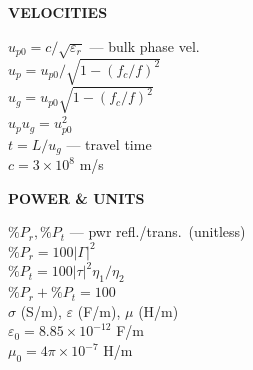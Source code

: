 \documentclass[6pt,letterpaper]{article}
\newcommand{\shead}[3]{%
  \noindent\colorbox{#1}{\parbox{\dimexpr\linewidth-2\fboxsep\relax}%
  {\color{#2}\bfseries\fontsize{6}{7}\selectfont #3}}\vspace{0.5pt}}
\begin{document}
\begin{minipage}[t]{0.19\linewidth}
\shead{amberbg}{amber}{VELOCITIES}
\begin{ebox}
$u_{p0}=c/\sqrt{\varepsilon_r}$ --- bulk phase vel.\\
$u_p=u_{p0}/\sqrt{1-(f_c/f)^2}$\\
$u_g=u_{p0}\sqrt{1-(f_c/f)^2}$\\
$u_p u_g = u_{p0}^2$\\
$t=L/u_g$ --- travel time\\
$c=3\times10^8$ m/s
\end{ebox}
\end{minipage}\hfill
\begin{minipage}[t]{0.19\linewidth}
\shead{graybg}{gray}{POWER \& UNITS}
\begin{ebox}
$\%P_r,\%P_t$ --- pwr refl./trans.\ (unitless)\\
$\%P_r\!=\!100|\Gamma|^2$\\
$\%P_t\!=\!100|\tau|^2\eta_1/\eta_2$\\
$\%P_r+\%P_t=100$\\
$\sigma$ (S/m), $\varepsilon$ (F/m), $\mu$ (H/m)\\
$\varepsilon_0\!=\!8.85\!\times\!10^{-12}$ F/m\\
$\mu_0\!=\!4\pi\!\times\!10^{-7}$ H/m
\end{ebox}
\end{minipage}
\end{document}
